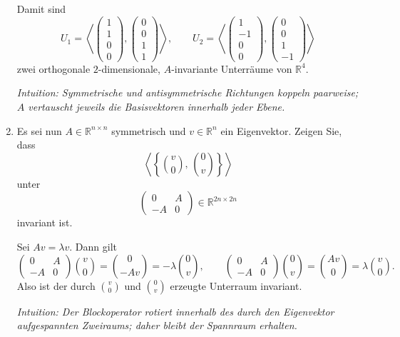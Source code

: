 \documentclass[11pt, a4paper]{article}
\begin{document}
\begin{enumerate}
\begin{framed}
\[  \]
  Damit sind
  \[
    U_1=\left\langle \begin{pmatrix}1\\1\\0\\0\end{pmatrix},
                       \begin{pmatrix}0\\0\\1\\1\end{pmatrix}\right\rangle,
    \qquad
    U_2=\left\langle \begin{pmatrix}1\\-1\\0\\0\end{pmatrix},
                       \begin{pmatrix}0\\0\\1\\-1\end{pmatrix}\right\rangle
  \]
  zwei orthogonale $2$-dimensionale, $A$-invariante Unterräume von $\mathbb{R}^4$.

  \medskip\noindent\textit{Intuition: Symmetrische und antisymmetrische Richtungen koppeln paarweise; $A$ vertauscht jeweils die Basisvektoren innerhalb jeder Ebene.}
  \end{framed}

  \item Es sei nun $A\in\mathbb{R}^{n\times n}$ symmetrisch und $v\in\mathbb{R}^n$ ein Eigenvektor. Zeigen Sie, dass
  \[
    \left\langle \left\{ \binom{v}{0},\,\binom{0}{v} \right\} \right\rangle
  \]
  unter
  \[
    \begin{pmatrix}0&A\\ -A&0\end{pmatrix}\in\mathbb{R}^{2n\times 2n}
  \]
  invariant ist.
  \begin{framed}
  Sei $Av=\lambda v$. Dann gilt
  \[
    \begin{pmatrix}0&A\\-A&0\end{pmatrix}\!\binom{v}{0}
      =\binom{0}{-Av}=-\lambda\binom{0}{v},\qquad
    \begin{pmatrix}0&A\\-A&0\end{pmatrix}\!\binom{0}{v}
      =\binom{Av}{0}=\lambda\binom{v}{0}.
  \]
  Also ist der durch $\binom{v}{0}$ und $\binom{0}{v}$ erzeugte Unterraum invariant.

  \medskip\noindent\textit{Intuition: Der Blockoperator rotiert innerhalb des durch den Eigenvektor aufgespannten Zweiraums; daher bleibt der Spannraum erhalten.}
  \end{framed}
\end{enumerate}

\vspace{0.5em}
\end{document}
